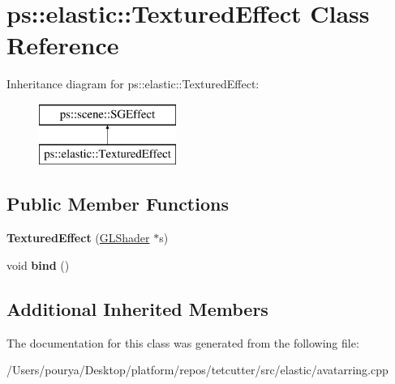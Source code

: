 \hypertarget{classps_1_1elastic_1_1TexturedEffect}{}\section{ps\+:\+:elastic\+:\+:Textured\+Effect Class Reference}
\label{classps_1_1elastic_1_1TexturedEffect}
Inheritance diagram for ps\+:\+:elastic\+:\+:Textured\+Effect\+:\begin{figure}[H]
\begin{center}
\leavevmode
\includegraphics[height=2.000000cm]{classps_1_1elastic_1_1TexturedEffect}
\end{center}
\end{figure}
\subsection*{Public Member Functions}
\begin{DoxyCompactItemize}
\item 
\hypertarget{classps_1_1elastic_1_1TexturedEffect_a1f702b5416e161ea73964c155eed6ca3}{}{\bfseries Textured\+Effect} (\hyperlink{classps_1_1opengl_1_1GLShader}{G\+L\+Shader} $\ast$s)\label{classps_1_1elastic_1_1TexturedEffect_a1f702b5416e161ea73964c155eed6ca3}

\item 
\hypertarget{classps_1_1elastic_1_1TexturedEffect_a127d4d9b456d658706985bc794a9c943}{}void {\bfseries bind} ()\label{classps_1_1elastic_1_1TexturedEffect_a127d4d9b456d658706985bc794a9c943}

\end{DoxyCompactItemize}
\subsection*{Additional Inherited Members}


The documentation for this class was generated from the following file\+:\begin{DoxyCompactItemize}
\item 
/\+Users/pourya/\+Desktop/platform/repos/tetcutter/src/elastic/avatarring.\+cpp\end{DoxyCompactItemize}
